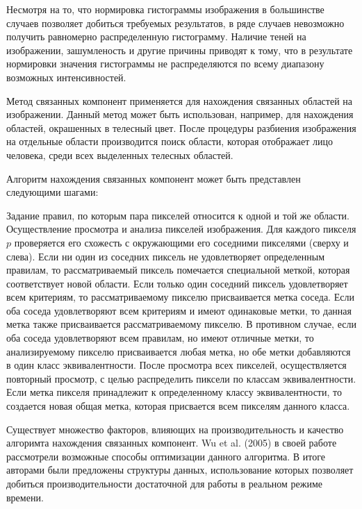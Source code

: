 
Несмотря на то, что нормировка гистограммы изображения в большинстве случаев позволяет добиться требуемых результатов, в ряде случаев невозможно получить равномерно распределенную гистограмму. Наличие теней на изображении, зашумленость и другие причины приводят к тому, что в результате нормировки значения гистограммы не распределяются по всему диапазону возможных интенсивностей.


Метод связанных компонент применяется для нахождения связанных областей на изображении. Данный метод может быть использован, например, для нахождения областей, окрашенных в телесный цвет. После процедуры разбиения изображения на отдельные области производится поиск области, которая отображает лицо человека, среди всех выделенных телесных областей.

Алгоритм нахождения связанных компонент может быть представлен следующими шагами:

\ol
	\li Задание правил, по которым пара пикселей относится к одной и той же области.
	\li Осуществление просмотра и анализа пикселей изображения.
	\li Для каждого пикселя $p$ проверяется его схожесть с окружающими его соседними пикселями (сверху и слева). Если ни один из соседних пиксель не удовлетворяет определенным правилам, то рассматриваемый пиксель помечается специальной меткой, которая соответствует новой области. Если только один соседний пиксель удовлетворяет всем критериям, то рассматриваемому пикселю присваивается метка соседа. Если оба соседа удовлетворяют всем критериям и имеют одинаковые метки, то данная метка также присваивается рассматриваемому пикселю. В противном случае, если оба соседа удовлетворяют всем правилам, но имеют отличные метки, то анализируемому пикселю присваивается любая метка, но обе метки добавляются в один класс эквивалентности. 
	\li После просмотра всех пикселей, осуществляется повторный просмотр, с целью распределить пиксели по классам эквивалентности. Если метка пикселя принадлежит к определенному классу эквивалентности, то создается новая общая метка, которая присвается всем пикселям данного класса.
\lo

Существует множество факторов, влияющих на производительность и качество алгоримта нахождения связанных компонент. Wu et al. (2005) в своей работе рассмотрели возможные способы оптимизации данного алгоритма. В итоге авторами были предложены структуры данных, использование которых позволяет добиться производительности достаточной для работы в реальном режиме времени.


